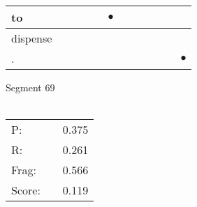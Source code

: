 \documentclass[landscape]{article}
\newcommand{\ssp}{\hspace{2pt}}
\newcommand{\mex}{\cellcolor{g}$\bullet$}
\begin{document}
\begin{tabular}{|l|p{10pt}|p{10pt}|p{10pt}|p{10pt}|p{10pt}|p{10pt}|p{10pt}|p{10pt}|p{10pt}|p{10pt}|p{10pt}|}
\hline
\ssp \cellcolor{ref4}to \ssp&\hspace{2pt}&\hspace{2pt}&\hspace{2pt}&\hspace{2pt}&\hspace{2pt}\mex&\hspace{2pt}&\hspace{2pt}&\hspace{2pt}&\hspace{2pt}&\hspace{2pt}&\hspace{2pt}\\
\hline
\ssp dispense \ssp&\hspace{2pt}&\hspace{2pt}&\hspace{2pt}&\hspace{2pt}&\hspace{2pt}&\hspace{2pt}&\hspace{2pt}&\hspace{2pt}&\hspace{2pt}&\hspace{2pt}&\hspace{2pt}\\
\hline
\ssp \cellcolor{ref10}. \ssp&\hspace{2pt}&\hspace{2pt}&\hspace{2pt}&\hspace{2pt}&\hspace{2pt}&\hspace{2pt}&\hspace{2pt}&\hspace{2pt}&\hspace{2pt}&\hspace{2pt}&\hspace{2pt}\mex\\
\hline
\end{tabular}

\vspace{6pt}
\noindent Segment 69\\\\
\noindent\begin{tabular}{lm{12pt}r}
\hline
P:&&0.375\\
R:&&0.261\\
Frag:&&0.566\\
Score:&&0.119\\
\end{tabular}
\end{document}
